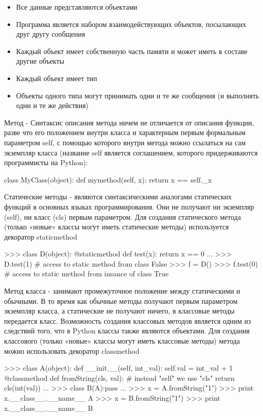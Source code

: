 \begin{itemize}
\item Все данные представляются объектами
\item Программа является набором взаимодействующих объектов, посылающих друг другу сообщения
\item Каждый объект имеет собственную часть памяти и может иметь в составе другие объекты
\item Каждый объект имеет тип
\item Объекты одного типа могут принимать одни и те же сообщения (и выполнять одни и те же действия)
\end{itemize}

Метод - Синтаксис описания метода ничем не отличается от описания функции, разве что его положением внутри класса и характерным первым формальным параметром self, с помощью которого внутри метода можно ссылаться на сам экземпляр класса (название self является соглашением, которого придерживаются программисты на Python):

\begin{python}
class MyClass(object):
    def mymethod(self, x):
        return x == self._x
\end{python}
Статические методы - являются синтаксическими аналогами статических функций в основных языках программирования. Они не получают ни экземпляр (self), ни класс (cls) первым параметром. Для создания статического метода (только «новые» классы могут иметь статические методы) используется декоратор staticmethod

\begin{python}
>>> class D(object):  
       @staticmethod
       def test(x):
           return x == 0
...
>>> D.test(1)    # access to static method from class
False
>>> f = D()
>>> f.test(0)    # access to static method from insance of class
True

\end{python}

Метод класса - занимают промежуточное положение между статическими и обычными. В то время как обычные методы получают первым параметром экземпляр класса, а статические не получают ничего, в классовые методы передается класс. Возможность создания классовых методов является одним из следствий того, что в Python классы также являются объектами. Для создания классового (только «новые» классы могут иметь классовые методы) метода можно использовать декоратор classmethod

\begin{python}
>>> class A(object):  
      def __init__(self, int_val):
          self.val = int_val + 1
      @classmethod
      def fromString(cls, val):   # instead "self" we use "cls"
          return cls(int(val))
...
>>> class B(A):pass
...
>>> x = A.fromString("1")
>>> print x.__class__.__name__
A
>>> x = B.fromString("1")
>>> print x.__class__.__name__
B	
\end{python}

